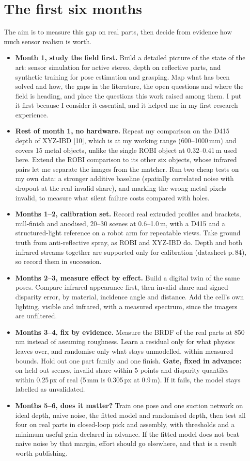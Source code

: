 \documentclass[10pt,a4paper]{article}
\newcommand{\cte}[1]{[#1]}
\begin{document}
\section{The first six months}
The aim is to measure this gap on real parts, then decide from evidence how much sensor realism is worth.
\begin{itemize}
\item \textbf{Month 1, study the field first.} Build a detailed picture of the state of the art: sensor simulation for active stereo, depth on reflective parts, and synthetic training for pose estimation and grasping. Map what has been solved and how, the gaps in the literature, the open questions and where the field is heading, and place the questions this work raised among them. I put it first because I consider it essential, and it helped me in my first research experience.
\item \textbf{Rest of month 1, no hardware.} Repeat my comparison on the D415 depth of XYZ-IBD \cte{10}, which is at my working range (600--1000\,mm) and covers 15 metal objects, unlike the single ROBI object at 0.32--0.41\,m used here. Extend the ROBI comparison to its other six objects, whose infrared pairs let me separate the images from the matcher. Run two cheap tests on my own data: a stronger additive baseline (spatially correlated noise with dropout at the real invalid share), and marking the wrong metal pixels invalid, to measure what silent failure costs compared with holes.
\item \textbf{Months 1--2, calibration set.} Record real extruded profiles and brackets, mill-finish and anodised, 20--30 scenes at 0.6--1.0\,m, with a D415 and a structured-light reference on a robot arm for repeatable views. Take ground truth from anti-reflective spray, as ROBI and XYZ-IBD do. Depth and both infrared streams together are supported only for calibration (datasheet p.\,84), so record them in succession.
\item \textbf{Months 2--3, measure effect by effect.} Build a digital twin of the same poses. Compare infrared appearance first, then invalid share and signed disparity error, by material, incidence angle and distance. Add the cell's own lighting, visible and infrared, with a measured spectrum, since the imagers are unfiltered.
\item \textbf{Months 3--4, fix by evidence.} Measure the BRDF of the real parts at 850\,nm instead of assuming roughness. Learn a residual only for what physics leaves over, and randomise only what stays unmodelled, within measured bounds. Hold out one part family and one finish. \textbf{Gate, fixed in advance:} on held-out scenes, invalid share within 5 points and disparity quantiles within 0.25\,px of real (5\,mm is 0.305\,px at 0.9\,m). If it fails, the model stays labelled as unvalidated.
\item \textbf{Months 5--6, does it matter?} Train one pose and one suction network on ideal depth, naive noise, the fitted model and randomised depth, then test all four on real parts in closed-loop pick and assembly, with thresholds and a minimum useful gain declared in advance. If the fitted model does not beat naive noise by that margin, effort should go elsewhere, and that is a result worth publishing.
\end{itemize}
\end{document}

